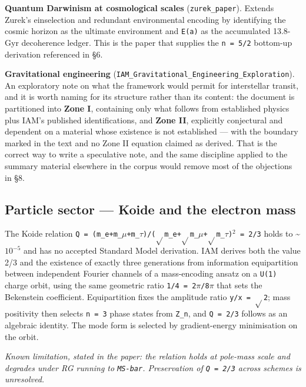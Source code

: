 \documentclass[12pt,a4paper]{article}
\begin{document}
\textbf{Quantum Darwinism at cosmological scales} (\texttt{zurek\_paper}). Extends Zurek's einselection and redundant environmental encoding by identifying the cosmic horizon as the ultimate environment and \texttt{E(a)} as the accumulated 13.8-Gyr decoherence ledger. This is the paper that supplies the \texttt{n = 5/2} bottom-up derivation referenced in \S6.


\textbf{Gravitational engineering} (\texttt{IAM\_Gravitational\_Engineering\_Exploration}). An exploratory note on what the framework would permit for interstellar transit, and it is worth naming for its structure rather than its content: the document is partitioned into \textbf{Zone I}, containing only what follows from established physics plus IAM's published identifications, and \textbf{Zone II}, explicitly conjectural and dependent on a material whose existence is not established --- with the boundary marked in the text and no Zone II equation claimed as derived. That is the correct way to write a speculative note, and the same discipline applied to the summary material elsewhere in the corpus would remove most of the objections in \S8.





\subsection{Particle sector --- Koide and the electron mass}

The Koide relation \texttt{Q = (m\_e+m\_$\mu$+m\_$\tau$)/($\sqrt{}$m\_e+$\sqrt{}$m\_$\mu$+$\sqrt{}$m\_$\tau$)$^{2}$ = 2/3} holds to \textasciitilde{}$10^{-5}$ and has no accepted Standard Model derivation. IAM derives both the value 2/3 and the existence of exactly three generations from information equipartition between independent Fourier channels of a mass-encoding ansatz on a \texttt{U(1)} charge orbit, using the same geometric ratio \texttt{1/4 = 2$\pi$/8$\pi$} that sets the Bekenstein coefficient. Equipartition fixes the amplitude ratio \texttt{y/x = $\sqrt{}$2}; mass positivity then selects \texttt{n = 3} phase states from \texttt{Z\_n}, and \texttt{Q = 2/3} follows as an algebraic identity. The mode form is selected by gradient-energy minimisation on the orbit.


\textit{Known limitation, stated in the paper: the relation holds at pole-mass scale and degrades under RG running to \texttt{MS-bar}. Preservation of \texttt{Q = 2/3} across schemes is unresolved.}
\end{document}

